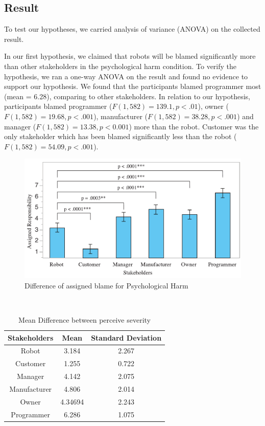\documentclass{sigchi}
\begin{document}
\subsection{Result}
To test our hypotheses, we carried analysis of variance (ANOVA) on the collected result. 

In our first hypothesis, we claimed that robots will be blamed significantly more than other stakeholders in the psychological harm condition. To verify the hypothesis, we ran a one-way ANOVA on the result and found no evidence to support our hypothesis. We found that the participants blamed programmer most (mean = 6.28), comparing to other stakeholders. In relation to our hypothesis, participants blamed programmer ($ F(1,582) =139.1, p < .01$), owner ($ F(1,582) = 19.68, p < .001$), manufacturer ($F(1,582) = 38.28, p < .001$) and manager ($F(1,582) = 13.38, p < 0.001$) more than the robot. Customer was the only stakeholder which has been blamed significantly less than the robot ($F(1,582) = 54.09, p < .001$).


\begin{figure}[!h]
\centering
\includegraphics[width=1.0\columnwidth]{psychologicalGraph}
\caption{Difference of assigned blame for Psychological Harm}
\label{fig:figure5}
\end{figure}

\hspace{1 mm} \\
\begin{table}[h]
  \centering
  \begin{tabular}{ccc}
    Stakeholders & Mean & Standard Deviation\\
    \hline
    Robot & 3.184 & 2.267\\
    Customer & 1.255 & 0.722\\
    Manager & 4.142 & 2.075 \\
    Manufacturer & 4.806 & 2.014 \\
    Owner & 4.34694 & 2.243 \\
    Programmer & 6.286 & 1.075 \\
    \hline
  \end{tabular}
  \caption{Mean Difference between perceive severity}
  \label{tab:table2}
\end{table}
\end{document}

